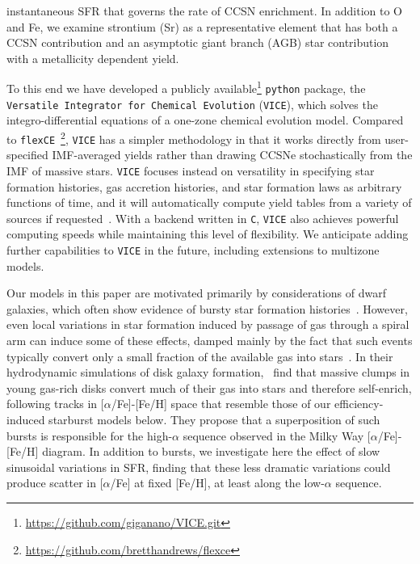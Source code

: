instantaneous SFR that governs the rate of CCSN enrichment. In addition to 
O and Fe, we examine strontium (Sr) as a representative element that has both 
a CCSN contribution and an asymptotic giant branch (AGB) star contribution 
with a metallicity dependent yield. 
\par 
To this end we have developed a publicly available\footnote{
	\url{https://github.com/giganano/VICE.git}
} \texttt{python} package, the \texttt{Versatile Integrator for Chemical 
Evolution} (\texttt{VICE}), which solves the integro-differential equations of 
a one-zone chemical evolution model. 
Compared to \texttt{flexCE}~\citep{Andrews2017}\footnote{
	\url{https://github.com/bretthandrews/flexce}
}, \texttt{VICE} has a simpler methodology in that it works directly from 
user-specified IMF-averaged yields rather than drawing CCSNe stochastically 
from the IMF of massive stars. \texttt{VICE} focuses instead on versatility 
in specifying star formation histories, gas accretion histories, and star 
formation laws as arbitrary functions of time, and it will automatically 
compute yield tables from a variety of sources if requested~\citep[e.g.][among 
others to be added in subsequent versions]{Woosley1995, Iwamoto1999, 
Chieffi2004, Karakas2010, Cristallo2011, Seitenzahl2013, Limongi2018}. With a 
backend written in \texttt{C}, \texttt{VICE} also achieves powerful computing 
speeds while maintaining this level of flexibility. We anticipate adding 
further capabilities to \texttt{VICE} in the future, including extensions to 
multizone models.
\par 
Our models in this paper are motivated primarily by considerations of dwarf 
galaxies, which often show evidence of bursty star formation 
histories~\citep[e.g.][]{Weisz2011, Weisz2014a}. However, even local variations 
in star formation induced by passage of gas through a spiral arm can induce 
some of these effects, damped mainly by the fact that such events typically 
convert only a small fraction of the available gas into 
stars~\citep{Weinberg2017b}. In their hydrodynamic simulations of disk 
galaxy formation,~\citet{Clarke2019} find that massive clumps in young 
gas-rich disks convert much of their gas into stars and therefore self-enrich, 
following tracks in [$\alpha$/Fe]-[Fe/H] space that resemble those of our 
efficiency-induced starburst models below. They propose that a superposition 
of such bursts is responsible for the high-$\alpha$ sequence observed in the 
Milky Way [$\alpha$/Fe]-[Fe/H] diagram. In addition to bursts, we investigate 
here the effect of slow sinusoidal variations in SFR, finding that these less 
dramatic variations could produce scatter in [$\alpha$/Fe] at fixed [Fe/H], at 
least along the low-$\alpha$ sequence. 

